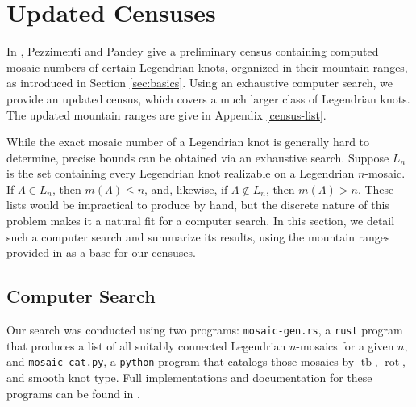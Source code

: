 \documentclass{article}
\DeclareMathOperator{\tb}{tb}
\DeclareMathOperator{\rot}{rot}
\begin{document}
\section{Updated Censuses} \label{algos}

In \cite{pezzimenti}, Pezzimenti and Pandey give a preliminary census containing computed mosaic numbers of certain Legendrian knots, organized in their mountain ranges, as introduced in Section \ref{sec:basics}. Using an exhaustive computer search, we provide an updated census, which covers a much larger class of Legendrian knots. The updated mountain ranges are give in Appendix \ref{census-list}.

While the exact mosaic number of a Legendrian knot is generally hard to determine, precise bounds can be obtained via an exhaustive search. Suppose $L_n$ is the set containing every Legendrian knot realizable on a Legendrian $n$-mosaic. If $\Lambda \in L_n$, then $m(\Lambda) \leq n$, and, likewise, if $\Lambda \notin L_n$, then $m(\Lambda) > n$. These lists would be impractical to produce by hand, but the discrete nature of this problem makes it a natural fit for a computer search. In this section, we detail such a computer search and summarize its results, using the mountain ranges provided in \cite{atlas} as a base for our censuses.

\subsection{Computer Search}\label{sec:search_details}

Our search was conducted using two programs: \texttt{mosaic-gen.rs}, a \texttt{rust} program that produces a list of all suitably connected Legendrian $n$-mosaics for a given $n$, and \texttt{mosaic-cat.py}, a \texttt{python} program that catalogs those mosaics by $\tb$, $\rot$, and smooth knot type. Full implementations and documentation for these programs can be found in \cite{code}. 
\end{document}
